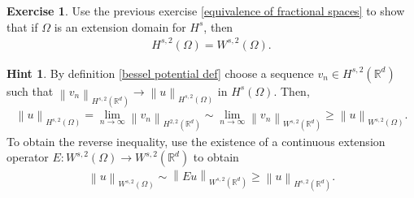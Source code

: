 \documentclass[
    a4paper,
    DIV=14,
    abstract=true,
    numbers=noenddot
]
{scrartcl}
\theoremstyle{definition}
\newtheorem{exercise}{Exercise}
\newtheorem*{hint}{Hint}
\renewcommand{\norm}[1]{\left\lVert #1 \right\rVert}\renewcommand{\abs}[1]{\left| #1 \right|}
\newcommand{\R}{\mathbb{R}}
\begin{document}
\begin{exercise}
    Use the previous exercise \ref{equivalence of fractional spaces} to show that if $\Omega $ is an extension domain for $H^{s}$, then
    \begin{align*}
        H^{s,2}(\Omega )=W^{s,2}(\Omega ).
    \end{align*}
\end{exercise}
\begin{hint}
    By definition \ref{bessel potential def} choose a sequence $v_n \in H^{s,2}(\R^d)$ such that $\norm{v_n}_{H^{s,2}(\R^d)} \to \norm{u}_{H^{s,2}(\Omega )}$ in $H^s(\Omega )$. Then,
    \begin{align*}
        \norm{u}_{H^{s,2}(\Omega)}= \lim_{n\to\infty}\norm{v_n}_{H^{2,2}(\R^d)}\sim \lim_{n\to\infty}\norm{v_n}_{W^{s,2}(\R^d)}\geq \norm{u}_{W^{s,2}(\Omega )}.
    \end{align*}
    To obtain the reverse inequality, use the existence of a continuous extension operator $E: W^{s,2}(\Omega )\to W^{s,2}(\R^d)$ to obtain
    \begin{align*}
        \norm{u}_{W^{s,2}(\Omega )}\sim \norm{Eu}_{W^{s,2}(\R^d)}\geq \norm{u}_{H^{s,2}(\R^d)}.
    \end{align*}

\end{hint}
\end{document}
